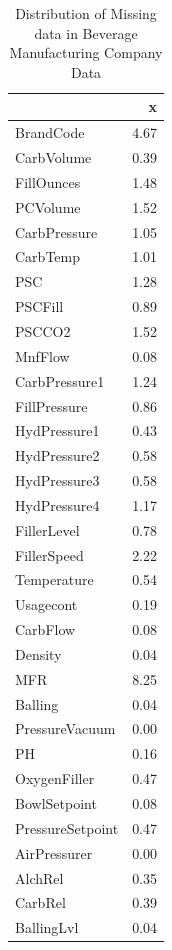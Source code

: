 \documentclass[]{report}
\begin{document}
\begin{table}[H]

\caption{\label{tab:project2a2}Distribution of Missing data in Beverage Manufacturing Company Data}
\centering
\begin{tabular}[t]{l|r}
\hline
\textbf{ } & \textbf{x}\\
\hline
\rowcolor{gray!6}  BrandCode & 4.67\\
\hline
CarbVolume & 0.39\\
\hline
\rowcolor{gray!6}  FillOunces & 1.48\\
\hline
PCVolume & 1.52\\
\hline
\rowcolor{gray!6}  CarbPressure & 1.05\\
\hline
CarbTemp & 1.01\\
\hline
\rowcolor{gray!6}  PSC & 1.28\\
\hline
PSCFill & 0.89\\
\hline
\rowcolor{gray!6}  PSCCO2 & 1.52\\
\hline
MnfFlow & 0.08\\
\hline
\rowcolor{gray!6}  CarbPressure1 & 1.24\\
\hline
FillPressure & 0.86\\
\hline
\rowcolor{gray!6}  HydPressure1 & 0.43\\
\hline
HydPressure2 & 0.58\\
\hline
\rowcolor{gray!6}  HydPressure3 & 0.58\\
\hline
HydPressure4 & 1.17\\
\hline
\rowcolor{gray!6}  FillerLevel & 0.78\\
\hline
FillerSpeed & 2.22\\
\hline
\rowcolor{gray!6}  Temperature & 0.54\\
\hline
Usagecont & 0.19\\
\hline
\rowcolor{gray!6}  CarbFlow & 0.08\\
\hline
Density & 0.04\\
\hline
\rowcolor{gray!6}  MFR & 8.25\\
\hline
Balling & 0.04\\
\hline
\rowcolor{gray!6}  PressureVacuum & 0.00\\
\hline
PH & 0.16\\
\hline
\rowcolor{gray!6}  OxygenFiller & 0.47\\
\hline
BowlSetpoint & 0.08\\
\hline
\rowcolor{gray!6}  PressureSetpoint & 0.47\\
\hline
AirPressurer & 0.00\\
\hline
\rowcolor{gray!6}  AlchRel & 0.35\\
\hline
CarbRel & 0.39\\
\hline
\rowcolor{gray!6}  BallingLvl & 0.04\\
\hline
\end{tabular}
\end{table}
\end{document}
